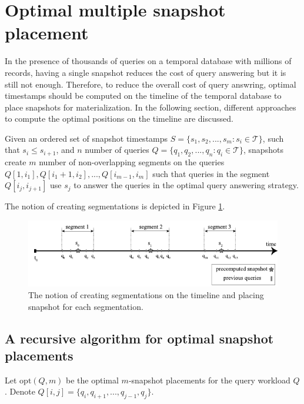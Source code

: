 	\section{Optimal multiple snapshot placement} \label{sec:optimal_multiple_snapshot}
		In the presence of thousands of queries on a temporal database with millions of records, having a single snapshot reduces the cost of query answering but it is still not enough. Therefore, to reduce the overall cost of query answring, optimal timestamps should be computed on the timeline of the temporal database to place snapshots for materialization. In the following section, different approaches to compute the optimal positions on the timeline are discussed.

		\begin{prop} 
			Given an ordered set of snapshot timestamps $S=\{s_1,s_2,...,s_m:s_i \in \mathcal{T}\}$, such that $s_i \leq s_{i+1}$, and $n$ number of queries $Q = \{q_1,q_2,...,q_n: q_i \in \mathcal{T}\}$, snapshots create $m$ number of non-overlapping segments on the queries $Q[1,i_1],Q[i_1+1,i_2],...,Q[i_{m-1},i_m]$ such that queries in the segment $Q[i_j,i_{j+1}]$ use $s_j$ to answer the queries in the optimal query answering strategy.
		\label{prop:segmentation_of_queries}
		\end{prop}
		The notion of creating segmentations is depicted in Figure \ref{fig:segmentation}.

		\begin{figure}
			\centering
			\includegraphics[width=\textwidth]{figs/segmentations.pdf}
			\caption{The notion of creating segmentations on the timeline and placing snapshot for each segmentation.}
			\label{fig:segmentation}
		\end{figure}

		\subsection{A recursive algorithm for optimal snapshot placements}

			Let $\mathrm{opt}(Q, m)$ be the optimal $m$-snapshot placements for the query workload $Q$. Denote $Q[i,j] = \{q_i,q_{i+1},...,q_{j-1},q_j\}$.

